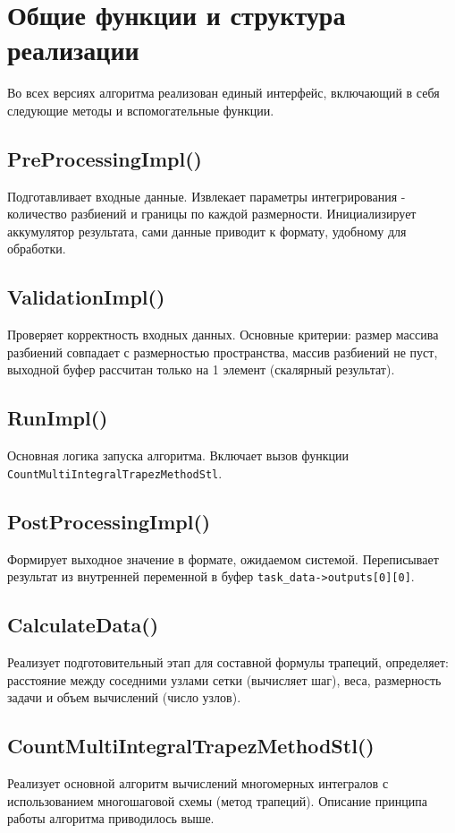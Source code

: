 \documentclass[12pt]{article}
\begin{document}
\section{Общие функции и структура реализации}
Во всех версиях алгоритма реализован единый интерфейс, включающий в себя следующие методы и вспомогательные функции.

\subsection*{PreProcessingImpl()}
Подготавливает входные данные. Извлекает параметры интегрирования - количество разбиений и границы по каждой размерности. Инициализирует аккумулятор результата, сами данные приводит к формату, удобному для обработки.

\subsection*{ValidationImpl()}
Проверяет корректность входных данных. Основные критерии: размер массива разбиений совпадает с размерностью пространства, массив разбиений не пуст, выходной буфер рассчитан только на 1 элемент (скалярный результат).

\subsection*{RunImpl()}
Основная логика запуска алгоритма. Включает вызов функции \texttt{CountMultiIntegralTrapezMethodStl}.

\subsection*{PostProcessingImpl()}
Формирует выходное значение в формате, ожидаемом системой. Переписывает результат из внутренней переменной в буфер \texttt{task\_data->outputs[0][0]}.

\subsection*{CalculateData()}
Реализует подготовительный этап для составной формулы трапеций, определяет: расстояние между соседними узлами сетки (вычисляет шаг), веса, размерность задачи и объем вычислений (число узлов).

\subsection*{CountMultiIntegralTrapezMethodStl()}
Реализует основной алгоритм вычислений многомерных интегралов с использованием многошаговой схемы (метод трапеций). Описание принципа работы алгоритма приводилось выше.
\end{document}
